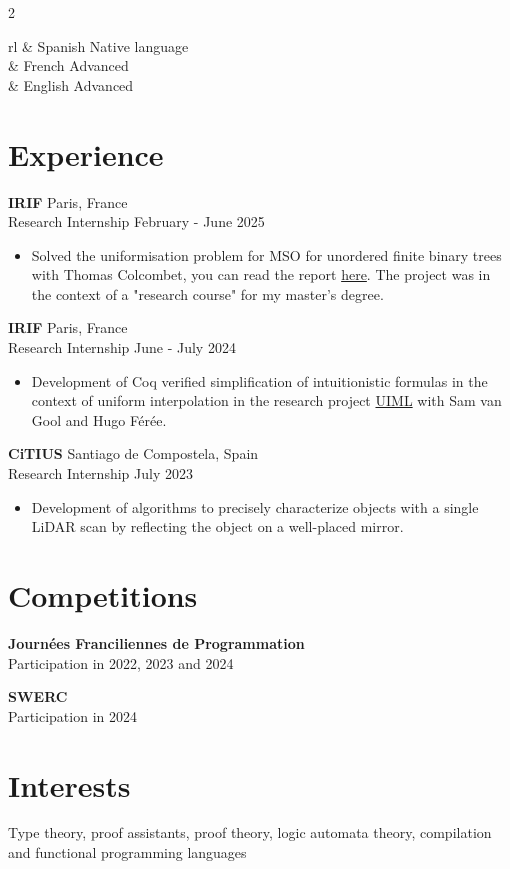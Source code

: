 \documentclass[12pt]{article}
\newcommand{\entry}[4]{{{\textbf{#1}}} \hfill #3 \\ #2 \hfill #4}
\newcommand{\tableentry}[3]{\textsc{#1} & #2\expandafter\ifstrequal\expandafter{#3}{}{\\}{\\[6pt]}}
\begin{document}
\begin{paracol}{2}
\begin{supertabular}{rl}
		\tableentry{\footnotesize\faLanguage}{Spanish \textperiodcentered{} Native language}{}
		\tableentry{}{French \textperiodcentered{} Advanced}{}
		\tableentry{}{English \textperiodcentered{} Advanced}{}
	\end{supertabular}

	\switchcolumn*

	\section{Experience}

	\entry{IRIF}{Research Internship}{Paris, France}{February - June 2025}
	\begin{itemize}[noitemsep,leftmargin=3.5mm,rightmargin=0mm,topsep=6pt]
		\item Solved the uniformisation problem for MSO for unordered finite binary trees with Thomas Colcombet, you can read the report \href{https://yag000.github.io/tree-uniformisation/main-uniformisation.pdf}{here}.
		      The project was in the context of a "research course" for my master's degree.
	\end{itemize}

	\entry{IRIF}{Research Internship}{Paris, France}{June - July 2024}
	\begin{itemize}[noitemsep,leftmargin=3.5mm,rightmargin=0mm,topsep=6pt]
		\item Development of Coq verified simplification of intuitionistic formulas in the context of uniform interpolation in the research project \href{https://github.com/hferee/UIML}{UIML}\cite{feree:hal-04859429}
		      with Sam van Gool and Hugo Férée.
	\end{itemize}


	\entry{CiTIUS}{Research Internship}{Santiago de Compostela, Spain}{July 2023}
	\begin{itemize}[noitemsep,leftmargin=3.5mm,rightmargin=0mm,topsep=6pt]
		\item Development of algorithms to precisely characterize objects with a single LiDAR scan by reflecting the object on a well-placed mirror.
	\end{itemize}

	\switchcolumn

	\section{Competitions}

	\textbf{Journées Franciliennes de Programmation}\\
	\noindent Participation in 2022, 2023 and 2024

	\textbf{SWERC}\\
	\noindent Participation in 2024

	\section{Interests}
    \justifying

    Type theory, proof assistants, proof theory, logic automata theory, compilation and functional programming languages


\end{paracol}
\end{document}
